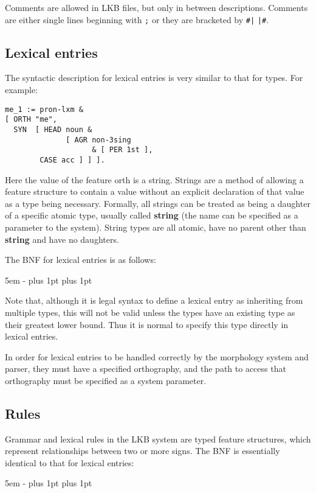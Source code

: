 \documentclass[12pt]{report}
\begin{document}
Comments are allowed in LKB files, but only in between descriptions.
Comments are either single lines
beginning with {\tt ;} or they are bracketed by {\tt \#|} {\tt |\#}.



\subsection{Lexical entries}
\label{lexsyntax}
The syntactic description for lexical entries is
very similar to that for types.  For example:
\begin{verbatim}
me_1 := pron-lxm & 
[ ORTH "me",
  SYN  [ HEAD noun & 
              [ AGR non-3sing 
                    & [ PER 1st ],
		CASE acc ] ] ].
\end{verbatim}
Here the value of the feature {\sc orth} is a string.
Strings are a method of allowing a feature structure to contain a 
value without an explicit declaration of that value as a type
being necessary.  Formally, all strings can be treated as
being a daughter of a specific atomic type, usually called {\bf string}
(the name can be specified as a parameter to the system).
String types are all atomic,
have no parent other than {\bf string} and have no daughters.

The BNF for lexical entries is as follows:
\begin{list}{}
   {\leftmargin 5em
    \itemindent -\leftmargin
    \itemsep 0pt plus 1pt
    \parsep 0pt plus 1pt}
\end{list}
Note that, although it is legal syntax to define a 
lexical entry as inheriting from multiple types,
this will not be valid unless the types have an
existing type as their greatest lower bound.
Thus it is normal to specify this type directly
in lexical entries.

In order for lexical entries to be handled correctly by
the morphology system and parser, they must have a specified
orthography, and the path to access that orthography
must be specified as a system parameter.

\subsection{Rules}
\label{rules}
Grammar and lexical rules in the LKB 
system are typed feature structures,
which represent relationships between two or more signs.
The BNF is essentially identical to that for
lexical entries:
\begin{list}{}
   {\leftmargin 5em
    \itemindent -\leftmargin
    \itemsep 0pt plus 1pt
    \parsep 0pt plus 1pt}
\end{list}
\end{document}
